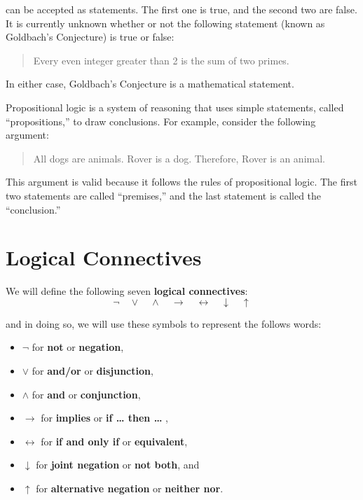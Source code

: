 \documentclass[
  letterpaper,
  10pt,
  reqno,
  twopage,
  openany]{book}
\providecommand{\tightlist}{%
  \setlength{\itemsep}{0pt}\setlength{\parskip}{0pt}}\usepackage{longtable,booktabs,array}
\theoremstyle{plain}
\theoremstyle{definition}
\theoremstyle{definition}
\theoremstyle{definition}
\theoremstyle{plain}
\theoremstyle{plain}
\theoremstyle{remark}
\begin{document}
can be accepted as statements. The first one is true, and the second two
are false. It is currently unknown whether or not the following
statement (known as Goldbach's Conjecture) is true or false:

\begin{quote}
Every even integer greater than 2 is the sum of two primes.
\end{quote}

In either case, Goldbach's Conjecture is a mathematical statement.

Propositional logic is a system of reasoning that uses simple
statements, called ``propositions,'' to draw conclusions. For example,
consider the following argument:

\begin{quote}
All dogs are animals. Rover is a dog. Therefore, Rover is an animal.
\end{quote}

This argument is valid because it follows the rules of propositional
logic. The first two statements are called ``premises,'' and the last
statement is called the ``conclusion.''

\hypertarget{logical-connectives}{%
\section{Logical Connectives}\label{logical-connectives}}

We will define the following seven 
\textbf{logical connectives}: \[
\neg \quad \lor \quad \land \quad \rightarrow \quad \leftrightarrow \quad \downarrow \quad \uparrow
\]

and in doing so, we will use these symbols to represent the follows
words:

\begin{itemize}
\tightlist
\item
  \(\neg\) for \textbf{not} or \textbf{negation},\\
\item
  \(\lor\) for \textbf{and/or} or \textbf{disjunction},\\
\item
  \(\land\) for \textbf{and} or \textbf{conjunction},
\item
  \(\rightarrow\) for \textbf{implies} or \textbf{if \ldots{} then
  \ldots{} },\\
\item
  \(\leftrightarrow\) for \textbf{if and only if} or
  \textbf{equivalent},\\
\item
  \(\downarrow\) for \textbf{joint negation} or \textbf{not both}, and\\
\item
  \(\uparrow\) for \textbf{alternative negation} or \textbf{neither
  nor}.
\end{itemize}
\end{document}
